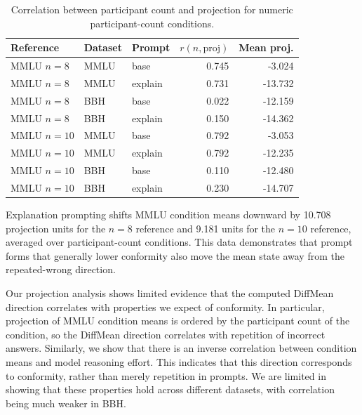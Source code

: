\begin{table}[t]
  \centering
  \caption{Correlation between participant count and projection for numeric
  participant-count conditions.}
  \label{tab:qwen-projection-correlations}
  \begin{tabular}{lllrr}
    \toprule
    Reference & Dataset & Prompt & $r(n,\mathrm{proj})$ & Mean proj. \\
    \midrule
    MMLU $n=8$ & MMLU & base & 0.745 & -3.024 \\
    MMLU $n=8$ & MMLU & explain & 0.731 & -13.732 \\
    MMLU $n=8$ & BBH & base & 0.022 & -12.159 \\
    MMLU $n=8$ & BBH & explain & 0.150 & -14.362 \\
    MMLU $n=10$ & MMLU & base & 0.792 & -3.053 \\
    MMLU $n=10$ & MMLU & explain & 0.792 & -12.235 \\
    MMLU $n=10$ & BBH & base & 0.110 & -12.480 \\
    MMLU $n=10$ & BBH & explain & 0.230 & -14.707 \\
    \bottomrule
  \end{tabular}
\end{table}

Explanation prompting shifts MMLU condition means downward by 10.708 projection
units for the $n=8$ reference and 9.181 units for the $n=10$ reference,
averaged over participant-count conditions. This data demonstrates that prompt
forms that generally lower conformity also move the mean state away from the
repeated-wrong direction.

Our projection analysis shows limited evidence that the computed DiffMean direction correlates with properties we expect of conformity.
In particular, projection of MMLU condition means is ordered by the participant count of the condition, so the DiffMean direction correlates with repetition of incorrect answers. Similarly, we show that there is an inverse correlation between condition means and model reasoning effort. This indicates that this direction corresponds to conformity, rather than merely repetition in prompts. We are limited in showing that these properties hold across different datasets, with correlation being much weaker in BBH.


